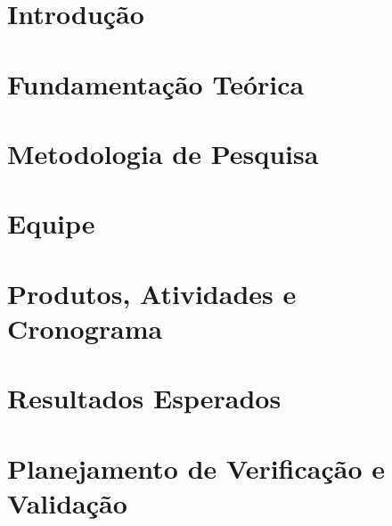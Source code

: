 \section{Introdução} %
\label{sec:introdu_o}
 

\section{Fundamentação Teórica} %
\label{sec:fundamentacao}
 

\section{Metodologia de Pesquisa} %
\label{sec:metodologia}
 

\section{Equipe} %
\label{sec:equipe}
 

\section{Produtos, Atividades e Cronograma} %
\label{sec:produtos}
 

\section{Resultados Esperados} %
\label{sec:resultados_esperados}
 

\section{Planejamento de Verificação e Validação} %
\label{sec:planejamento}
 
